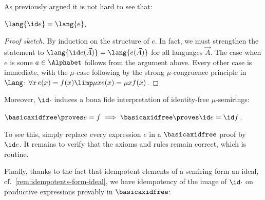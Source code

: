 As previously argued it is not hard to see that:
\begin{proposition}
\label{idem-trans-equiv-in-lang}
    $\lang {\id e} = \lang {e}$.
\end{proposition}
\begin{proof}
[Proof sketch]
    By induction on the structure of $e$. In fact, we must strengthen the statement to $\lang {\id e(\vec A)} = \lang {e(\vec A)}$ for all languages $\vec A$.
    The case when $e$ is some $a \in \Alphabet$ follows from the argument above.
    Every other case is immediate, with the $\mu$-case following by the strong $\mu$-congruence principle in $\Lang$: $\forall x\,    e(x) =f(x) \limp \mu x e(x) = \mu x f(x)$.
\end{proof}

Moreover, $\id \cdot$ induces a bona fide interpretation of identity-free $\mu$-semirings:

\begin{proposition}
\label{idem-trans-is-an-interp}
    $\basicaxidfree\proves e=f \implies \basicaxidfree \proves \id e = \id f$.
\end{proposition}
\noindent
To see this, simply replace every expression $e $ in a $\basicaxidfree$ proof by $\id e$. It remains to verify that the axioms and rules remain correct, which is routine.




Finally, thanks to the fact that idempotent elements of a semiring form an ideal, cf.~\cref{rem:idempotents-form-ideal}, we have idempotency of the image of $\id \cdot $ on productive expressions provably in $\basicaxidfree$:

